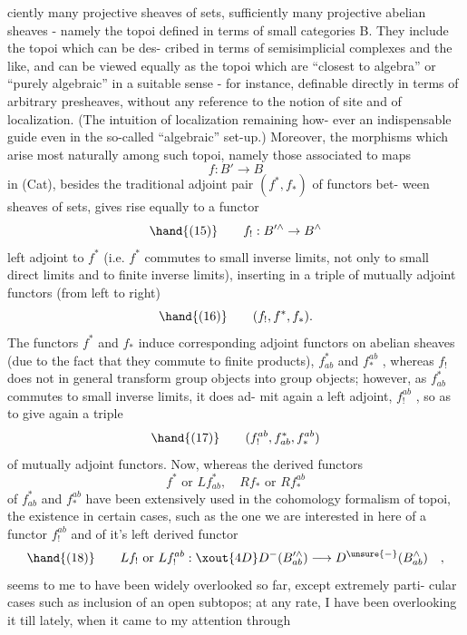 
ciently many  projective sheaves of sets,  
sufficiently many projective abelian sheaves - namely the topoi  defined
in terms of small categories B. They include the topoi which can be des-%
cribed in terms of semisimplicial complexes and the like, and can be
viewed equally as the topoi which are ``closest to algebra'' or ``purely
algebraic'' in a suitable sense - for instance, definable directly in
terms of arbitrary presheaves, without any reference to the notion of
site and of localization. (The intuition of localization remaining how-%
ever an indispensable guide even in the so-called ``algebraic'' set-up.)
Moreover, the morphisms which arise most naturally among such topoi,
namely those associated to maps 
\[ f : B' \longrightarrow B \]
in (Cat), besides the traditional adjoint pair $(f^{*},f_{*})$ of functors bet-%
ween sheaves of sets, gives rise equally to a functor
\[ \hand{(15)} \qquad f_{!} : B'^{\wedge} \rightarrow B^{\wedge} \]
left adjoint to $f^{*}$ (i.e. $f^{*}$ commutes to small inverse limits, not only
to small direct limits and to finite inverse limits), inserting in a
triple of mutually adjoint functors (from left to right)
\[ \hand{(16)} \qquad (f_{!} , f^{*}, f_{*} ) . \]
The functors $f^{*}$ and $f_{*}$ induce corresponding adjoint functors on abelian
sheaves (due to the fact that they commute to finite products), $f^{*}_{ab}$ and
$f^{ab}_{*}$ , whereas $f_{!}$ does not in general transform group objects into group
objects; however, as $f^{*}_{ab}$ commutes to small inverse limits, it does ad-%
mit again a left adjoint, $f^{ab}_{!}$ , so as to give again a triple
\[ \hand{(17)} \qquad (f^{ab}_{!} , f^{*}_{ab} , f^{ab}_{*}) \]
of mutually adjoint functors. Now, whereas the derived functors
\[ f^{*} \text{ or } Lf^{*}_{ab} , \quad Rf_{*} \text{ or } Rf^{ab}_{*} \]
of $f^{*}_{ab}$ and $f^{ab}_{*}$ have been extensively used in the  cohomology formalism
of topoi, the  existence in certain cases, \hand{(}such as the one we are
interested in here\hand{)} of a functor $f^{ab}_{!}$ and of it's left derived functor
\[ \hand{(18)} \qquad Lf_{!} \text{ or } Lf^{ab}_{!} : \xout{4D} D^{-}(B'^{\wedge}_{ab}) \longrightarrow D^{\unsure{-}}(B^{\wedge}_{ab}) \quad , \]
seems to me to have been widely overlooked so far, except  extremely parti-%
cular cases such as inclusion of an open subtopos; at any rate, I have
been overlooking it till lately, when it came to my attention through

